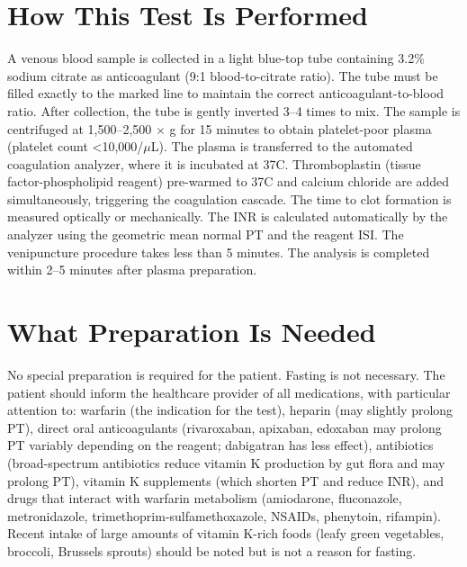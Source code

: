 \section*{How This Test Is Performed}
A venous blood sample is collected in a light blue-top tube containing 3.2\% sodium citrate as anticoagulant (9:1 blood-to-citrate ratio). The tube must be filled exactly to the marked line to maintain the correct anticoagulant-to-blood ratio. After collection, the tube is gently inverted 3--4 times to mix. The sample is centrifuged at 1,500--2,500 $\times$ g for 15 minutes to obtain platelet-poor plasma (platelet count <10,000/$\mu$L). The plasma is transferred to the automated coagulation analyzer, where it is incubated at 37\textdegree{}C. Thromboplastin (tissue factor-phospholipid reagent) pre-warmed to 37\textdegree{}C and calcium chloride are added simultaneously, triggering the coagulation cascade. The time to clot formation is measured optically or mechanically. The INR is calculated automatically by the analyzer using the geometric mean normal PT and the reagent ISI. The venipuncture procedure takes less than 5 minutes. The analysis is completed within 2--5 minutes after plasma preparation.

\section*{What Preparation Is Needed}
No special preparation is required for the patient. Fasting is not necessary. The patient should inform the healthcare provider of all medications, with particular attention to: warfarin (the indication for the test), heparin (may slightly prolong PT), direct oral anticoagulants (rivaroxaban, apixaban, edoxaban may prolong PT variably depending on the reagent; dabigatran has less effect), antibiotics (broad-spectrum antibiotics reduce vitamin K production by gut flora and may prolong PT), vitamin K supplements (which shorten PT and reduce INR), and drugs that interact with warfarin metabolism (amiodarone, fluconazole, metronidazole, trimethoprim-sulfamethoxazole, NSAIDs, phenytoin, rifampin). Recent intake of large amounts of vitamin K-rich foods (leafy green vegetables, broccoli, Brussels sprouts) should be noted but is not a reason for fasting.


